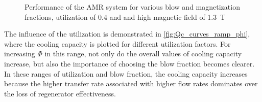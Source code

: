 \documentclass[referee]{svjour3}
\begin{document}
\begin{figure}[!ht]
  \centering
\quad
  \caption{Performance of the AMR system for various blow and magnetization fractions, utilization of 0.4 and and high magnetic field of \SI{1.3}{\tesla}}
  \label{fig:Qc_COP_curves_phi40}
\end{figure}

The influence of the utilization is demonstrated in \autoref{fig:Qc_curves_ramp_phi}, where the cooling capacity is plotted for different utilization factors. For increasing $\Phi$ in this range, not only do the overall values of cooling capacity increase, but also the importance of choosing the blow fraction becomes clearer. In these ranges of utilization and blow fraction,  the cooling capacity increases because the higher transfer rate associated with higher flow rates dominates over the loss of regenerator effectiveness.
\end{document}
